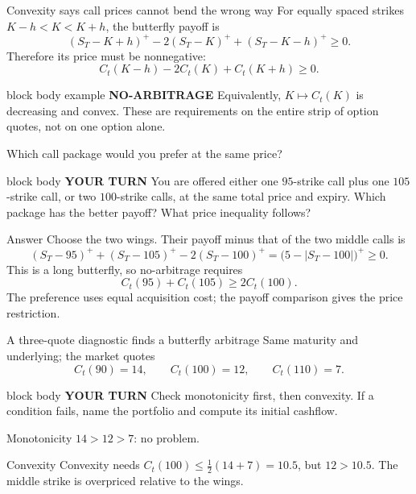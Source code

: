 \documentclass[handout,10pt,aspectratio=169]{beamer}
\newenvironment{marketbox}{\begin{beamercolorbox}[rounded=true,sep=0.7em,wd=\textwidth]{block body example}
  \textbf{\color{CourseGreen}NO-ARBITRAGE}\quad}{\end{beamercolorbox}}
\newenvironment{pausebox}{\begin{beamercolorbox}[rounded=true,sep=0.8em,wd=\textwidth]{block body}
  \textbf{\color{CourseGold}YOUR TURN}\quad}{\end{beamercolorbox}}
\newcommand{\1}{\mathbf 1}
\begin{document}
\begin{frame}{Convexity says call prices cannot bend the wrong way}
For equally spaced strikes \(K-h<K<K+h\), the butterfly payoff is
\[
(S_T-K+h)^+-2(S_T-K)^++(S_T-K-h)^+\ge0.
\]
Therefore its price must be nonnegative:
\[
\boxed{C_t(K-h)-2C_t(K)+C_t(K+h)\ge0.}
\]
\begin{marketbox}
Equivalently, \(K\mapsto C_t(K)\) is decreasing and convex. These are
requirements on the entire strip of option quotes, not on one option alone.
\end{marketbox}
\end{frame}

\begin{frame}{Which call package would you prefer at the same price?}
\begin{pausebox}
You are offered either one \(95\)-strike call plus one \(105\)-strike call,
or two \(100\)-strike calls, at the same total price and expiry.
Which package has the better payoff? What price inequality follows?
\end{pausebox}

\begin{exampleblock}{Answer}
Choose the two wings. Their payoff minus that of the two middle calls is
\[
(S_T-95)^++(S_T-105)^+-2(S_T-100)^+
=\bigl(5-|S_T-100|\bigr)^+\ge0.
\]
This is a long butterfly, so no-arbitrage requires
\[
\boxed{C_t(95)+C_t(105)\ge2C_t(100).}
\]
The preference uses equal acquisition cost; the payoff comparison gives
the price restriction.
\end{exampleblock}
\end{frame}

\begin{frame}{A three-quote diagnostic finds a butterfly arbitrage}
Same maturity and underlying; the market quotes
\[
C_t(90)=14,\qquad C_t(100)=12,\qquad C_t(110)=7.
\]
\begin{pausebox}
Check monotonicity first, then convexity. If a condition fails, name the
portfolio and compute its initial cashflow.
\end{pausebox}

\begin{block}{Monotonicity}
\(14>12>7\): no problem.
\end{block}
\begin{alertblock}{Convexity}
Convexity needs \(C_t(100)\le\tfrac12(14+7)=10.5\), but \(12>10.5\).
The middle strike is overpriced relative to the wings.
\end{alertblock}
\end{frame}
\end{document}

